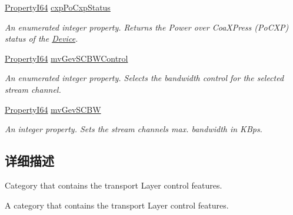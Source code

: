 \begin{DoxyCompactItemize}
\hyperlink{group___common_interface_ga81749b2696755513663492664a18a893}{Property\+I64} \hyperlink{classmv_i_m_p_a_c_t_1_1acquire_1_1_gen_i_cam_1_1_transport_layer_control_a1e37e452ded0cff7e6586ee0e71fe42b}{cxp\+Po\+Cxp\+Status}
\begin{DoxyCompactList}\small\item\em An enumerated integer property. Returns the Power over Coa\+X\+Press (Po\+C\+X\+P) status of the \hyperlink{classmv_i_m_p_a_c_t_1_1acquire_1_1_device}{Device}. \end{DoxyCompactList}\item 
\hyperlink{group___common_interface_ga81749b2696755513663492664a18a893}{Property\+I64} \hyperlink{classmv_i_m_p_a_c_t_1_1acquire_1_1_gen_i_cam_1_1_transport_layer_control_afd5e25e4bad86b18796ea5897827356f}{mv\+Gev\+S\+C\+B\+W\+Control}
\begin{DoxyCompactList}\small\item\em An enumerated integer property. Selects the bandwidth control for the selected stream channel. \end{DoxyCompactList}\item 
\hyperlink{group___common_interface_ga81749b2696755513663492664a18a893}{Property\+I64} \hyperlink{classmv_i_m_p_a_c_t_1_1acquire_1_1_gen_i_cam_1_1_transport_layer_control_a683be77efd347acef98e8088311d1cb2}{mv\+Gev\+S\+C\+B\+W}
\begin{DoxyCompactList}\small\item\em An integer property. Sets the stream channels max. bandwidth in K\+Bps. \end{DoxyCompactList}\end{DoxyCompactItemize}


\subsection{详细描述}
Category that contains the transport Layer control features. 

A category that contains the transport Layer control features. 

